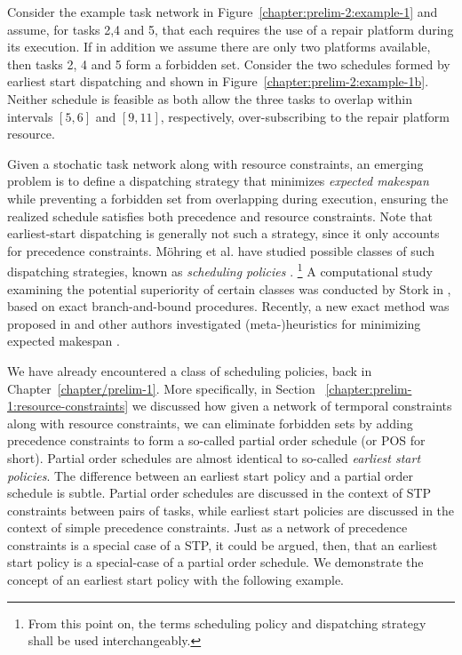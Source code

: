 	\begin{example}
		Consider the example task network in Figure~\ref{chapter:prelim-2:example-1} and assume, 
		for tasks 2,4 and 5, that each requires the use of a repair platform during its execution.
		If in addition we assume there are only two platforms available, then tasks 2, 4 and 5 form a forbidden set.
		Consider the two schedules formed by earliest start dispatching and shown in Figure~\ref{chapter:prelim-2:example-1b}.
		Neither schedule is feasible as both allow the three tasks to overlap within intervals $[5, 6]$ and $[9, 11]$, respectively,
		over-subscribing to the repair platform resource.
	\end{example}

	Given a stochatic task network along with resource constraints,
	an emerging problem is to define a dispatching strategy that minimizes \emph{expected makespan} while preventing a forbidden set from overlapping during execution,
	ensuring the realized schedule satisfies both precedence and resource constraints.
	Note that earliest-start dispatching is generally not such a strategy, 
	since it only accounts for precedence constraints.
	M\"ohring et al. have studied possible classes of such dispatching strategies,
	known as \emph{scheduling policies} \cite{mohring1984stochastic,mohring1985stochastic}.%
	\footnote{From this point on, the terms scheduling policy and dispatching strategy shall be used interchangeably.}
	A computational study examining the potential superiority of certain classes was conducted by Stork in \cite{stork2000branch}, 
	based on exact branch-and-bound procedures.
	Recently, a new exact method was proposed in \cite{creemers2015minimizing} and
	other authors investigated (meta-)heuristics for minimizing expected makespan \cite{ashtiani2011new, ballestin2009resource}.

	We have already encountered a class of scheduling policies, back in Chapter~\ref{chapter/prelim-1}.
	More specifically, in Section ~\ref{chapter:prelim-1:resource-constraints} we discussed how given a network of termporal constraints along with resource constraints,
	we can eliminate forbidden sets by adding precedence constraints to form a so-called partial order schedule (or POS for short).
	Partial order schedules are almost identical to so-called \emph{earliest start policies}.
	The difference between an earliest start policy and a partial order schedule is subtle.
	Partial order schedules are discussed in the context of STP constraints between pairs of tasks,
	while earliest start policies are discussed in the context of simple precedence constraints.
	Just as a network of precedence constraints is a special case of a STP, 
	it could be argued, then, that an earliest start policy is a special-case of a partial order schedule.
	We demonstrate the concept of an earliest start policy with the following example.

